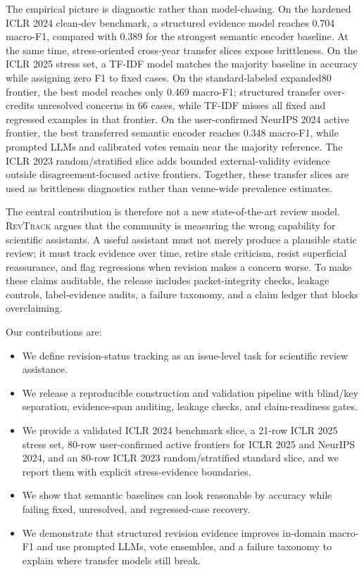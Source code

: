 The empirical picture is diagnostic rather than model-chasing.
On the hardened ICLR 2024 clean-dev benchmark, a structured evidence model reaches 0.704 macro-F1, compared with 0.389 for the strongest semantic encoder baseline.
At the same time, stress-oriented cross-year transfer slices expose brittleness.
On the ICLR 2025 stress set, a TF-IDF model matches the majority baseline in accuracy while assigning zero F1 to fixed cases.
On the standard-labeled expanded80 frontier, the best model reaches only 0.469 macro-F1; structured transfer over-credits unresolved concerns in 66 cases, while TF-IDF misses all fixed and regressed examples in that frontier.
On the user-confirmed NeurIPS 2024 active frontier, the best transferred semantic encoder reaches 0.348 macro-F1, while prompted LLMs and calibrated votes remain near the majority reference.
The ICLR 2023 random/stratified slice adds bounded external-validity evidence outside disagreement-focused active frontiers.
Together, these transfer slices are used as brittleness diagnostics rather than venue-wide prevalence estimates.

The central contribution is therefore not a new state-of-the-art review model.
\textsc{RevTrack} argues that the community is measuring the wrong capability for scientific assistants.
A useful assistant must not merely produce a plausible static review; it must track evidence over time, retire stale criticism, resist superficial reassurance, and flag regressions when revision makes a concern worse.
To make these claims auditable, the release includes packet-integrity checks, leakage controls, label-evidence audits, a failure taxonomy, and a claim ledger that blocks overclaiming.

Our contributions are:
\begin{itemize}[leftmargin=*]
\item We define revision-status tracking as an issue-level task for scientific review assistance.
\item We release a reproducible construction and validation pipeline with blind/key separation, evidence-span auditing, leakage checks, and claim-readiness gates.
\item We provide a validated ICLR 2024 benchmark slice, a 21-row ICLR 2025 stress set, 80-row user-confirmed active frontiers for ICLR 2025 and NeurIPS 2024, and an 80-row ICLR 2023 random/stratified standard slice, and we report them with explicit stress-evidence boundaries.
\item We show that semantic baselines can look reasonable by accuracy while failing fixed, unresolved, and regressed-case recovery.
\item We demonstrate that structured revision evidence improves in-domain macro-F1 and use prompted LLMs, vote ensembles, and a failure taxonomy to explain where transfer models still break.
\end{itemize}
